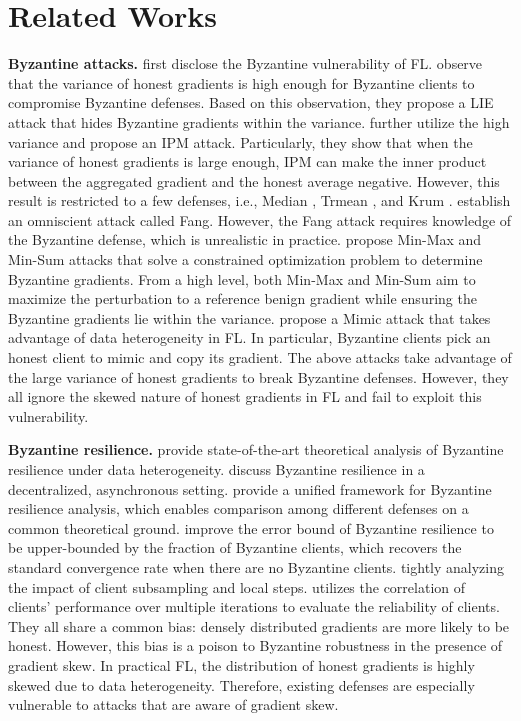 \section{Related Works}
\textbf{Byzantine attacks.}
\citeauthor{blanchard2017krum} first disclose the Byzantine vulnerability of FL.
\citeauthor{baruch2019lie} observe that the variance of honest gradients is high enough for Byzantine clients to compromise Byzantine defenses. 
Based on this observation, they propose a LIE attack that hides Byzantine gradients within the variance.
\citeauthor{xie2020ipm} further utilize the high variance and propose an IPM attack.
Particularly, they show that when the variance of honest gradients is large enough, IPM can make the inner product between the aggregated gradient and the honest average negative.
However, this result is restricted to a few defenses, i.e., Median \cite{yin2018mediantrmean}, Trmean \cite{yin2018mediantrmean}, and Krum \cite{blanchard2017krum}.
\citeauthor{fang2020fang} establish an omniscient attack called Fang.
However, the Fang attack requires knowledge of the Byzantine defense, which is unrealistic in practice.
\citeauthor{shejwalkar2021dnc} propose Min-Max and Min-Sum attacks that solve a constrained optimization problem to determine Byzantine gradients.
From a high level, both Min-Max and Min-Sum aim to maximize the perturbation to a reference benign gradient while ensuring the Byzantine gradients lie within the variance.
\citeauthor{karimireddy2022bucketing} propose a Mimic attack that takes advantage of data heterogeneity in FL.
In particular, Byzantine clients pick an honest client to mimic and copy its gradient.
The above attacks take advantage of the large variance of honest gradients to break Byzantine defenses.
However, they all ignore the skewed nature of honest gradients in FL and fail to exploit this vulnerability.

\textbf{Byzantine resilience.}
\citeauthor{el2021collaborative, karimireddy2022bucketing} provide state-of-the-art theoretical analysis of Byzantine resilience under data heterogeneity.
\citeauthor{el2021collaborative} discuss Byzantine resilience in a decentralized, asynchronous setting.
\citeauthor{farhadkhani2022reasm} provide a unified framework for Byzantine resilience analysis, which enables comparison among different defenses on a common theoretical ground.
\citeauthor{karimireddy2022bucketing} improve the error bound of Byzantine resilience to be upper-bounded by the fraction of Byzantine clients, which recovers the standard convergence rate when there are no Byzantine clients.
\citeauthor{allouah2024byzantinerobust} tightly analyzing the impact of client subsampling and local steps.
\citeauthor{yan2024recess} utilizes the correlation of clients’ performance over multiple iterations to evaluate the reliability of clients.
They all share a common bias: densely distributed gradients are more likely to be honest.
However, this bias is a poison to Byzantine robustness in the presence of gradient skew.
In practical FL, the distribution of honest gradients is highly skewed due to data heterogeneity.
Therefore, existing defenses are especially vulnerable to attacks that are aware of gradient skew.

